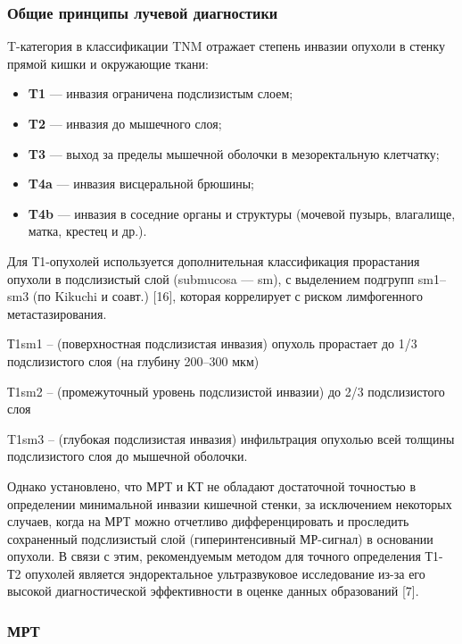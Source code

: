 \documentclass[
  russian,
  12pt,
  a4paper,
]{report}
\begin{document}
\subsubsection{Общие принципы лучевой
диагностики}\label{ux43eux431ux449ux438ux435-ux43fux440ux438ux43dux446ux438ux43fux44b-ux43bux443ux447ux435ux432ux43eux439-ux434ux438ux430ux433ux43dux43eux441ux442ux438ux43aux438}

T-категория в классификации TNM отражает степень инвазии опухоли в
стенку прямой кишки и окружающие ткани:

\begin{itemize}
\item
  \textbf{T1} --- инвазия ограничена подслизистым слоем;
\item
  \textbf{T2} --- инвазия до мышечного слоя;
\item
  \textbf{T3} --- выход за пределы мышечной оболочки в мезоректальную
  клетчатку;
\item
  \textbf{T4a} --- инвазия висцеральной брюшины;
\item
  \textbf{T4b} --- инвазия в соседние органы и структуры (мочевой
  пузырь, влагалище, матка, крестец и др.).
\end{itemize}

Для Т1-опухолей используется дополнительная классификация прорастания
опухоли в подслизистый слой (submucosa --- sm), с выделением подгрупп
sm1--sm3 (по Kikuchi и соавт.) {[}16{]}, которая коррелирует с риском
лимфогенного метастазирования.

Т1sm1 -- (поверхностная подслизистая инвазия) опухоль прорастает до 1/3
подслизистого слоя (на глубину 200--300 мкм)

Т1sm2 -- (промежуточный уровень подслизистой инвазии) до 2/3
подслизистого слоя

T1sm3 -- (глубокая подслизистая инвазия) инфильтрация опухолью всей
толщины подслизистого слоя до мышечной оболочки.

Однако установлено, что МРТ и КТ не обладают достаточной точностью в
определении минимальной инвазии кишечной стенки, за исключением
некоторых случаев, когда на МРТ можно отчетливо дифференцировать и
проследить сохраненный подслизистый слой (гиперинтенсивный МР-сигнал) в
основании опухоли. В связи с этим, рекомендуемым методом для точного
определения Т1-Т2 опухолей является эндоректальное ультразвуковое
исследование из-за его высокой диагностической эффективности в оценке
данных образований {[}7{]}.

\subsubsection{МРТ}\label{ux43cux440ux442-1}
\end{document}
